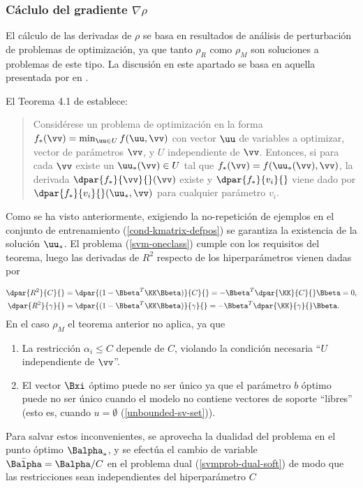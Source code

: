 \subsubsection{Cáclulo del gradiente $\nabla\rho$}
El cálculo de las derivadas de $\rho$ se basa en resultados de
análisis de perturbación de problemas de optimización, ya que tanto
$\rho_R$ como $\rho_M$ son soluciones a problemas de este tipo.  La
discusión en este apartado se basa en aquella presentada por
\citeauthor{chung} en \cite{chung}.

El Teorema 4.1 de \cite{bonnans-shapiro} establece:

\begin{quote}
  Considérese un problema de optimización en la forma
  $f_*(\vv)=\min_{\uu\in{}U}f(\uu,\vv)$ con vector $\uu$ de variables a
  optimizar, vector de parámetros $\vv$, y $U$ independiente de
  $\vv$. Entonces, si para cada $\vv$ existe un $\uu_*(\vv)\in{}U$
  tal que $f_*(\vv)=f(\uu_*(\vv),\vv)$, la derivada
  $\dpar{f_*}{\vv}{}(\vv)$ existe y $\dpar{f_*}{v_i}{}$ viene dado por
  $\dpar{f_*}{v_i}{}(\uu_*,\vv)$ para cualquier parámetro $v_i$.
\end{quote}

Como se ha visto anteriormente, exigiendo la no-repetición de ejemplos
en el conjunto de entrenamiento (\ref{cond-kmatrix-defpos}) se
garantiza la existencia de la solución $\uu_*$.
El problema (\ref{svm-oneclass}) cumple con los requisitos del teorema,
luego las derivadas de $R^2$ respecto de los hiperparámetros vienen
dadas por

\begin{align}
  \dpar{R^2}{C}{} &= \dpar{(1-\Bbeta^T\KK\Bbeta)}{C}{}
  = -\Bbeta^T \dpar{\KK}{C}{}\Bbeta = 0, \\
  \dpar{R^2}{\gamma}{} &= \dpar{(1-\Bbeta^T\KK\Bbeta)}{\gamma}{}
  = -\Bbeta^T \dpar{\KK}{\gamma}{}\Bbeta.
\end{align}
En el caso $\rho_M$ el teorema anterior no aplica, ya que

\begin{enumerate}
\item La restricción $\alpha_i\leq{}C$ depende de $C$, violando la condición
  necesaria ``$U$ independiente de $\vv$''.
\item El vector $\Bxi$ óptimo puede no ser único ya que el parámetro $b$ óptimo
  puede no ser único cuando el modelo no contiene vectores de soporte
  ``libres'' (esto es, cuando $u=\emptyset$ (\ref{unbounded-sv-set})).
\end{enumerate}
Para salvar estos inconvenientes, se aprovecha la dualidad del
problema en el punto óptimo $\Balpha_*$, y se efectúa el cambio de
variable $\bar{\Balpha}=\Balpha/C$ en el problema dual
(\ref{svmprob-dual-soft}) de modo que las restricciones sean
independientes del hiperparámetro $C$

